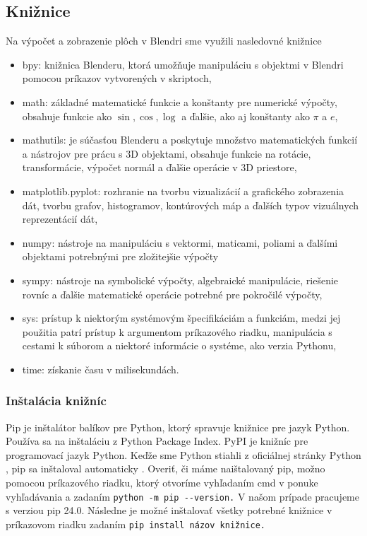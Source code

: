 \subsection{Knižnice}
Na výpočet a zobrazenie plôch v Blendri sme využili nasledovné knižnice
\begin{itemize}
\item bpy: knižnica Blenderu, ktorá umožňuje manipuláciu s objektmi v Blendri pomocou príkazov vytvorených v skriptoch,
\item math: základné matematické funkcie a konštanty pre numerické výpočty, obsahuje funkcie ako $\sin, \cos, \log$ a ďalšie, ako aj konštanty ako $\pi$ a $e$,
\item mathutils: je súčasťou Blenderu a poskytuje množstvo matematických funkcií a nástrojov pre prácu s 3D objektami, obsahuje funkcie na rotácie, transformácie, výpočet normál a ďalšie operácie v 3D priestore,
\item matplotlib.pyplot: rozhranie na tvorbu vizualizácií a grafického zobrazenia dát, tvorbu grafov, histogramov, kontúrových máp a ďalších typov vizuálnych reprezentácií dát,
\item numpy: nástroje na manipuláciu s vektormi, maticami, poliami a ďalšími objektami potrebnými pre zložitejšie výpočty 
\item sympy: nástroje na symbolické výpočty, algebraické manipulácie, riešenie rovníc a ďalšie matematické operácie potrebné pre pokročilé výpočty,
\item sys: prístup k niektorým systémovým špecifikáciám a funkciám, medzi jej použitia patrí prístup k argumentom príkazového riadku, manipulácia s cestami k súborom a niektoré informácie o systéme, ako verzia Pythonu,
\item time: získanie času v milisekundách. 
\end{itemize}
\subsubsection{Inštalácia knižníc}
Pip je inštalátor balíkov pre Python, ktorý spravuje knižnice pre jazyk Python. Používa sa na inštaláciu z Python Package Index. PyPI je knižníc pre programovací jazyk Python. Keďže sme Python stiahli z oficiálnej stránky Python \cite{PythonDownload}, pip sa inštaloval automaticky \cite{Pip}. Overiť, či máme naištalovaný pip, možno pomocou príkazového riadku, ktorý otvoríme vyhľadaním cmd v ponuke vyhľadávania a zadaním
\verb|python -m pip --version.|
V našom prípade pracujeme s verziou pip 24.0. Následne je možné inštalovať všetky potrebné knižnice v príkazovom riadku zadaním \verb|pip install názov knižnice.|
